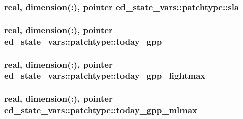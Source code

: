\subsubsection[{\texorpdfstring{sla}{sla}}]{\setlength{\rightskip}{0pt plus 5cm}real, dimension(\+:), pointer ed\+\_\+state\+\_\+vars\+::patchtype\+::sla}\hypertarget{structed__state__vars_1_1patchtype_ad2bb11cb190087e83ce61352115e8925}{}\label{structed__state__vars_1_1patchtype_ad2bb11cb190087e83ce61352115e8925}
\subsubsection[{\texorpdfstring{today\+\_\+gpp}{today_gpp}}]{\setlength{\rightskip}{0pt plus 5cm}real, dimension(\+:), pointer ed\+\_\+state\+\_\+vars\+::patchtype\+::today\+\_\+gpp}\hypertarget{structed__state__vars_1_1patchtype_a2b2b67d24287d39e58e5e6738feb5529}{}\label{structed__state__vars_1_1patchtype_a2b2b67d24287d39e58e5e6738feb5529}
\subsubsection[{\texorpdfstring{today\+\_\+gpp\+\_\+lightmax}{today_gpp_lightmax}}]{\setlength{\rightskip}{0pt plus 5cm}real, dimension(\+:), pointer ed\+\_\+state\+\_\+vars\+::patchtype\+::today\+\_\+gpp\+\_\+lightmax}\hypertarget{structed__state__vars_1_1patchtype_a4c21b1a42ceb17284cfa4b4e966fb765}{}\label{structed__state__vars_1_1patchtype_a4c21b1a42ceb17284cfa4b4e966fb765}
\subsubsection[{\texorpdfstring{today\+\_\+gpp\+\_\+mlmax}{today_gpp_mlmax}}]{\setlength{\rightskip}{0pt plus 5cm}real, dimension(\+:), pointer ed\+\_\+state\+\_\+vars\+::patchtype\+::today\+\_\+gpp\+\_\+mlmax}\hypertarget{structed__state__vars_1_1patchtype_a0c2616ae9f2d9477cc967b724aa957f6}{}\label{structed__state__vars_1_1patchtype_a0c2616ae9f2d9477cc967b724aa957f6}
